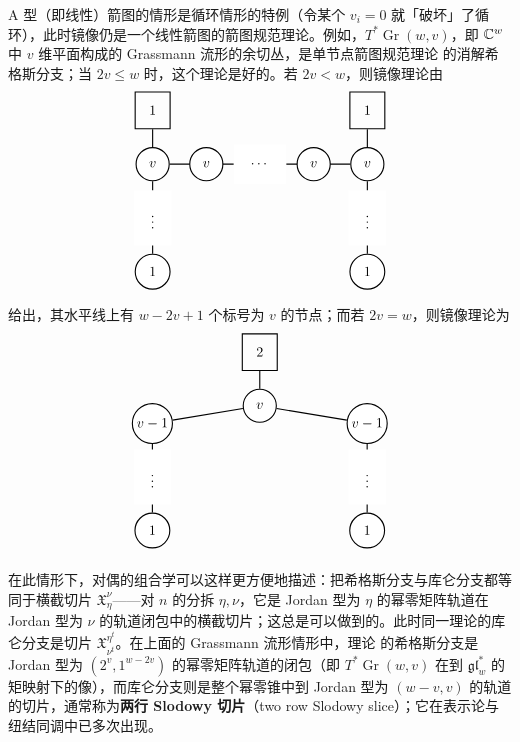 A 型（即线性）箭图的情形是循环情形的特例（令某个 $v_i=0$ 就「破坏」了循环），此时镜像仍是一个线性箭图的箭图规范理论。例如，$T^*\operatorname{Gr}(w,v)$，即 $\mathbb{C}^w$ 中 $v$ 维平面构成的 Grassmann 流形的余切丛，是单节点箭图规范理论  的消解希格斯分支；当 $2v\leq w$ 时，这个理论是好的。若 $2v<w$，则镜像理论由
\begin{equation*}
\tikz[scale=.9]{
	\node[draw, thick, inner sep=10pt] (bb) at (-6,1.5) {$1$};
	\node[draw, thick, circle, inner sep=6pt,fill=white] (a) at (-6,-3) {$1$};
	\node[inner sep=12pt,fill=white] (ab) at (-6,-1.5){$\vdots$};
	\node[draw, thick, circle, inner sep=6pt,fill=white] (b) at (-6,0) {$v$};	
	\node[draw, thick, inner sep=10pt] (dd) at (0,1.5) {$1$};
		\node[draw, thick, circle, inner sep=6pt,fill=white] (d) at (0,0) {$v$};
	\node[draw, thick, circle, inner sep=6pt,fill=white] (e) at (0,-3) {$1$};
	\node[inner sep=12pt,fill=white] (de) at (0,-1.5){$\vdots$};
	\node[inner sep=12pt,fill=white] (c) at (-3,0){$\cdots$};
		\draw[thick] (a) -- (ab) --(b) --(bb);
		\draw[thick] (b) -- (c) ;
		\draw[thick] (c) -- (d) ;
		\draw[thick] (e) -- (de) --(d) --(dd);
				\node[draw, thick, circle, inner sep=6pt,fill=white] (d) at (-1.5,0) {$v$};
						\node[draw, thick, circle, inner sep=6pt,fill=white] (d) at (-4.5,0) {$v$};
}
\end{equation*}
给出，其水平线上有 $w-2v+1$ 个标号为 $v$ 的节点；而若 $2v=w$，则镜像理论为
\begin{equation*}
\tikz[scale=.9]{
	\node[draw, thick, inner sep=10pt] (cc) at (-3,1.5) {$2$};
	\node[draw, thick, circle, inner sep=6pt,fill=white] (a) at (-6,-3.5) {$1$};
	\node[inner sep=12pt,fill=white] (ab) at (-6,-2){$\vdots$};
	\node[draw, thick, circle, inner sep=2pt,fill=white] (b) at (-6,-.5) {$v-1$};	
		\node[draw, thick, circle, inner sep=6pt,fill=white] (c) at (-3,0) {$v$};
		\node[draw, thick, circle, inner sep=2pt,fill=white] (d) at (0,-.5) {$v-1$};
	\node[draw, thick, circle, inner sep=6pt,fill=white] (e) at (0,-3.5) {$1$};
	\node[inner sep=12pt,fill=white] (de) at (0,-2){$\vdots$};
		\draw[thick] (a) -- (ab) --(b);
		\draw[thick] (b) -- (c) --(cc);
		\draw[thick] (c) -- (d) ;
		\draw[thick] (e) -- (de) --(d) ;
}
\end{equation*}

在此情形下，对偶的组合学可以这样更方便地描述：把希格斯分支与库仑分支都等同于横截切片 $\mathfrak{X}^{\nu}_{\eta}$——对 $n$ 的分拆 $\eta,\nu$，它是 Jordan 型为 $\eta$ 的幂零矩阵轨道在 Jordan 型为 $\nu$ 的轨道闭包中的横截切片；这总是可以做到的。此时同一理论的库仑分支是切片 $\mathfrak{X}^{\eta^t}_{\nu^t}$。在上面的 Grassmann 流形情形中，理论  的希格斯分支是 Jordan 型为 $(2^v,1^{w-2v})$ 的幂零矩阵轨道的闭包（即 $T^*\operatorname{Gr}(w,v)$ 在到 $\mathfrak{gl}_{w}^*$ 的矩映射下的像），而库仑分支则是整个幂零锥中到 Jordan 型为 $(w-v,v)$ 的轨道的切片，通常称为{\bf 两行 Slodowy 切片}（two row Slodowy slice）；它在表示论与纽结同调中已多次出现。

